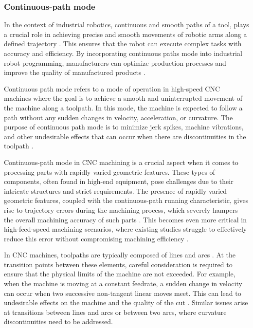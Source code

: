 \subsubsection{Continuous-path mode}
In the context of industrial robotics, continuous and smooth paths of a tool, plays a crucial role in achieving precise and smooth movements of robotic arms along a defined trajectory \cite{Jia.2018}. This ensures that the robot can execute complex tasks with accuracy and efficiency. By incorporating continuous paths mode into industrial robot programming, manufacturers can optimize production processes and improve the quality of manufactured products \cite{Zhang.2020}.

Continuous path mode refers to a mode of operation in high-speed CNC machines where the goal is to achieve a smooth and uninterrupted movement of the machine along a toolpath. In this mode, the machine is expected to follow a path without any sudden changes in velocity, acceleration, or curvature. The purpose of continuous path mode is to minimize jerk spikes, machine vibrations, and other undesirable effects that can occur when there are discontinuities in the toolpath \cite{Jia.2018, Yang.2017}. 
 
Continuous-path mode in CNC machining is a crucial aspect when it comes to processing parts with rapidly varied geometric features. These types of components, often found in high-end equipment, pose challenges due to their intricate structures and strict requirements. The presence of rapidly varied geometric features, coupled with the continuous-path running characteristic, gives rise to trajectory errors during the machining process, which severely hampers the overall machining accuracy of such parts \cite{Shahzadeh.2018}. This becomes even more critical in high-feed-speed machining scenarios, where existing studies struggle to effectively reduce this error without compromising machining efficiency \cite{Li.2018}.

In CNC machines, toolpaths are typically composed of lines and arcs \cite{Liu.2020}. At the transition points between these elements, careful consideration is required to ensure that the physical limits of the machine are not exceeded. For example, when the machine is moving at a constant feedrate, a sudden change in velocity can occur when two successive non-tangent linear moves meet. This can lead to undesirable effects on the machine and the quality of the cut \cite{Boujelbene.2004}. Similar issues arise at transitions between lines and arcs or between two arcs, where curvature discontinuities need to be addressed.  

